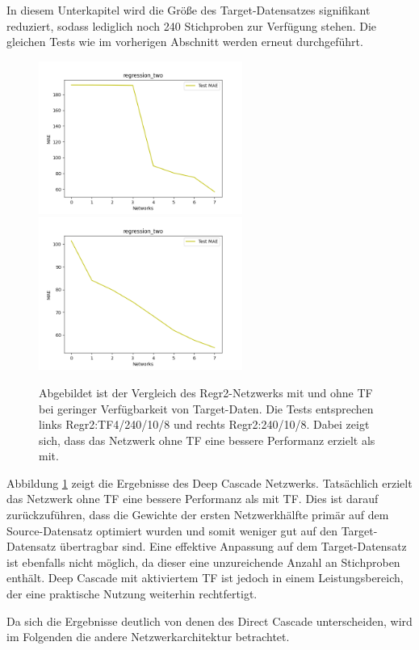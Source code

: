 In diesem Unterkapitel wird die Größe des Target-Datensatzes signifikant reduziert, sodass lediglich noch 240 Stichproben zur Verfügung stehen. 
Die gleichen Tests wie im vorherigen Abschnitt werden erneut durchgeführt.

\begin{figure}[htpb]
    \includegraphics[height=5cm]{../../Plots/ba_plots/regression_small/regr2_ts.png}
    \includegraphics[height=5cm]{../../Plots/ba_plots/regression_small/woregr2_ts.png}
    \caption{\label{fig:smallregr} 
    \small{Abgebildet ist der Vergleich des Regr2-Netzwerks mit und ohne TF bei geringer Verfügbarkeit von Target-Daten. Die Tests entsprechen 
    links Regr2:TF4/240/10/8 und rechts Regr2:240/10/8. Dabei zeigt sich, dass das Netzwerk ohne TF eine bessere Performanz 
    erzielt als mit.}}
\end{figure}

Abbildung \ref{fig:smallregr} zeigt die Ergebnisse des Deep Cascade Netzwerks. Tatsächlich erzielt das Netzwerk ohne TF eine 
bessere Performanz als mit TF. Dies ist darauf zurückzuführen, dass die Gewichte der ersten Netzwerkhälfte primär auf dem 
Source-Datensatz optimiert wurden und somit weniger gut auf den Target-Datensatz übertragbar sind. 
Eine effektive Anpassung auf dem Target-Datensatz ist ebenfalls nicht möglich, da dieser eine unzureichende Anzahl an Stichproben enthält. 
Deep Cascade mit aktiviertem TF ist jedoch in einem Leistungsbereich, der eine praktische Nutzung weiterhin rechtfertigt.

Da sich die Ergebnisse deutlich von denen des Direct Cascade unterscheiden, wird im Folgenden die andere Netzwerkarchitektur betrachtet.

